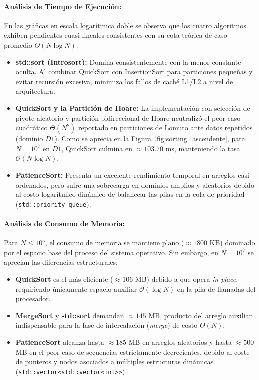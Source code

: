 \paragraph{Análisis de Tiempo de Ejecución:}
En las gráficas en escala logarítmica doble se observa que los cuatro algoritmos exhiben pendientes cuasi-lineales consistentes con su cota teórica de caso promedio $\Theta(N \log N)$.
\begin{itemize}
    \item \textbf{std::sort (Introsort):} Domina consistentemente con la menor constante oculta. Al combinar QuickSort con InsertionSort para particiones pequeñas y evitar recursión excesiva, minimiza los fallos de caché L1/L2 a nivel de arquitectura.
    \item \textbf{QuickSort y la Partición de Hoare:} La implementación con selección de pivote aleatorio y partición bidireccional de Hoare neutralizó el peor caso cuadrático $\Theta(N^2)$ reportado en particiones de Lomuto ante datos repetidos (dominio $D1$). Como se aprecia en la Figura~\ref{fig:sorting_ascendente}, para $N=10^7$ en $D1$, QuickSort culmina en $\approx 103.70$ ms, manteniendo la tasa $\mathcal{O}(N \log N)$.
    \item \textbf{PatienceSort:} Presenta un excelente rendimiento temporal en arreglos casi ordenados, pero sufre una sobrecarga en dominios amplios y aleatorios debido al costo logarítmico dinámico de balancear las pilas en la cola de prioridad (\texttt{std::priority\_queue}).
\end{itemize}

\paragraph{Análisis de Consumo de Memoria:}
Para $N \le 10^5$, el consumo de memoria se mantiene plano ($\approx 1800$ KB) dominado por el espacio base del proceso del sistema operativo. Sin embargo, en $N = 10^7$ se aprecian las diferencias estructurales:
\begin{itemize}
    \item \textbf{QuickSort} es el más eficiente ($\approx 106$ MB) debido a que opera \textit{in-place}, requiriendo únicamente espacio auxiliar $\mathcal{O}(\log N)$ en la pila de llamadas del procesador.
    \item \textbf{MergeSort} y \textbf{std::sort} demandan $\approx 145$ MB, producto del arreglo auxiliar indispensable para la fase de intercalación (\textit{merge}) de costo $\Theta(N)$.
    \item \textbf{PatienceSort} alcanza hasta $\approx 185$ MB en arreglos aleatorios y hasta $\approx 500$ MB en el peor caso de secuencias estrictamente decrecientes, debido al coste de punteros y nodos asociados a múltiples estructuras dinámicas (\texttt{std::vector<std::vector<int>>}).
\end{itemize}

